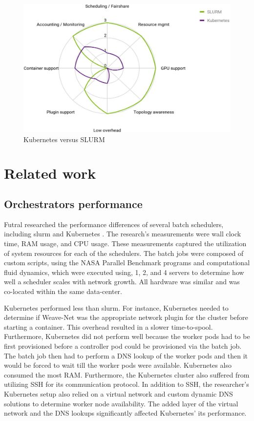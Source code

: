 \documentclass[conference]{IEEEtran}
\begin{document}
\begin{figure}[H]
\centering
\includegraphics[width=\columnwidth]{images/hpc_vs_data_science.png}
\caption{Kubernetes versus SLURM}
\label{fig:kube_vs_slurm}
\end{figure}


\section{Related work}
\subsection{Orchestrators performance}
Futral researched the performance differences of several batch schedulers, including \gls{slurm} and Kubernetes \cite{futral2019method}. The research's measurements were wall clock time, RAM usage, and CPU usage. These measurements captured the utilization of system resources for each of the schedulers. The batch jobs were composed of custom scripts, using the NASA Parallel Benchmark programs and computational fluid dynamics, which were executed using, 1, 2, and 4 servers to determine how well a scheduler scales with network growth. All hardware was similar and was co-located within the same data-center.

Kubernetes performed less than \gls{slurm}. For instance, Kubernetes needed to determine if Weave-Net was the appropriate network plugin for the cluster before starting a container. This overhead resulted in a slower time-to-spool. Furthermore, Kubernetes did not perform well because the worker pods had to be first provisioned before a controller pod could be provisioned via the batch job. The batch job then had to perform a DNS lookup of the worker pods and then it would be forced to wait till the worker pods were available. Kubernetes also consumed the most RAM. Furthermore, the Kubernetes cluster also suffered from utilizing SSH for its communication protocol. In addition to SSH, the researcher's Kubernetes setup also relied on a virtual network and custom dynamic DNS solutions to determine worker node availability. The added layer of the virtual network and the DNS lookups significantly affected Kubernetes' its performance.
\end{document}
